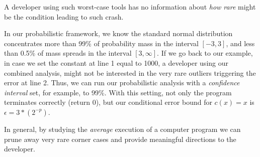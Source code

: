 %
A developer using such worst-case tools has no information about \emph{how rare} might be the condition leading to such crash. 
%

In our probabilistic framework, we know the standard normal distribution concentrates more than 99\% of probability mass in the interval $[−3, 3]$, and less than 0.5\% of mass spreads in the interval $[3, \infty]$.
%
If we go back to our example, in case we set the constant at line 1 equal to 1000, a developer using our combined analysis, might not be interested in the very rare outliers triggering the error at line 2.
%
Thus, we can run our probabilistic analysis with a \emph{confidence interval} set, for example, to 99\%.
%
%
With this setting, not only the program terminates correctly (return 0), but our conditional error bound for $c(x)=x$ is $\epsilon = 3*(2^{-p})$.
%

In general, by studying the \emph{average} execution of a computer program we can prune away very rare corner cases and provide meaningful directions to the developer.
%
\newpage



%
%
%

%
%
